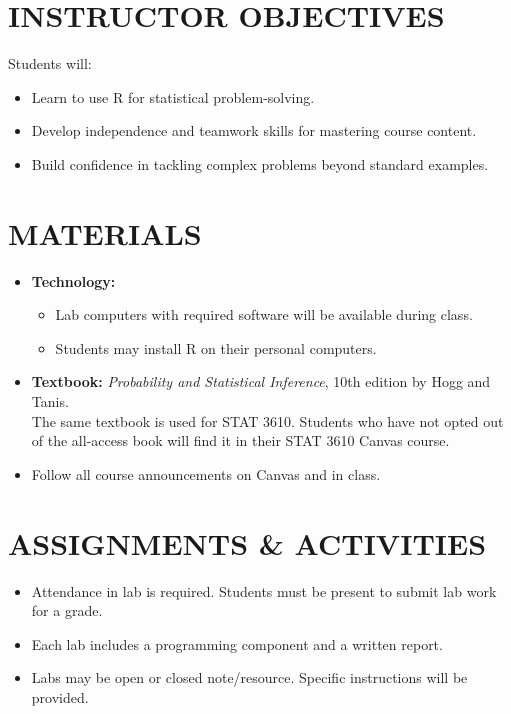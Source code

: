 \documentclass[12pt]{article}
\begin{document}
\section*{INSTRUCTOR OBJECTIVES}
Students will:
\begin{itemize}
    \item Learn to use R for statistical problem-solving.
    \item Develop independence and teamwork skills for mastering course content.
    \item Build confidence in tackling complex problems beyond standard examples.
\end{itemize}

\section*{MATERIALS}
\begin{itemize}
    \item \textbf{Technology:}
    \begin{itemize}
        \item Lab computers with required software will be available during class.
        \item Students may install R on their personal computers.
    \end{itemize}
    \item \textbf{Textbook:} \emph{Probability and Statistical Inference}, 10th edition by Hogg and Tanis. \\
    The same textbook is used for STAT 3610. Students who have not opted out of the all-access book will find it in their STAT 3610 Canvas course.
    \item Follow all course announcements on Canvas and in class.
\end{itemize}

\section*{ASSIGNMENTS \& ACTIVITIES}
\begin{itemize}
    \item Attendance in lab is required. Students must be present to submit lab work for a grade.
    \item Each lab includes a programming component and a written report.
    \item Labs may be open or closed note/resource. Specific instructions will be provided.
\end{itemize}
\end{document}
